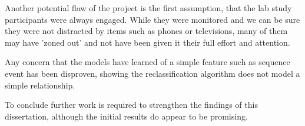 \documentclass{article}
\begin{document}
Another potential flaw of the project is the first assumption, that the lab study participants were always engaged.
While they were monitored and we can be sure they were not distracted by items such as phones or televisions, many of them may have 'zoned out' and not have been given it their full effort and attention.

Any concern that the models have learned of a simple feature such as sequence event has been disproven, showing the reclassification algorithm does not model a simple relationship.

To conclude further work is required to strengthen the findings of this dissertation, although the initial results do appear to be promising.



\singlespacing
\printbibliography


\end{document}
